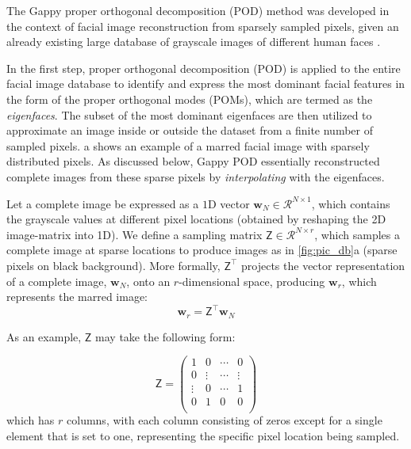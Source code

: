 \documentclass[11pt]{article}
\renewcommand{\vec}[1]{\mathbf{#1}}
\newcommand{\mat}[1]{\mathsf{#1}}
\begin{document}
        The Gappy proper orthogonal decomposition (POD) method was developed in the context of facial image reconstruction from sparsely sampled pixels, given an already existing large database of grayscale images of different human faces \cite{sirovich1987low-dimensional}.


        In the first step, proper orthogonal decomposition (POD) is applied to the entire facial image database to identify and express the most dominant facial features in the form of the proper orthogonal modes (POMs), which are termed as the \textit{eigenfaces}.
        The subset of the most dominant eigenfaces are then utilized to approximate an image inside or outside  the dataset from a finite number of sampled pixels.
        a shows an example of a marred facial image with sparsely distributed pixels.
        As discussed below, Gappy POD essentially reconstructed complete images from these sparse pixels by \textit{interpolating} with the eigenfaces.


        Let a complete image be expressed as a $1$D vector $\vec{w}_N\in \mathcal{R}^{N\times 1}$, which contains the grayscale values at different pixel locations (obtained by reshaping the 2D image-matrix into 1D).
        We define a sampling matrix $\mat{Z}\in \mathcal{R}^{N\times r}$, which samples a complete image at sparse locations to produce images as in \cref{fig:pic_db}a (sparse pixels on black background).
        More formally, $\mat{Z}^{\top}$ projects the vector representation of a complete image, $\vec{w}_N$, onto an $r$-dimensional space, producing $\vec{w}_r$, which represents the marred image:
        \begin{equation}
        {\vec{w}}_r = \mat{Z}^{\top} \vec{w}_N
        \end{equation}

        As an example, $\mat{Z}$ may take the following form:

        \begin{equation}
        \mat{Z} =
        \begin{pmatrix}
            1 & 0 & \cdots & 0\\
            0 &  \vdots & \cdots &  \vdots \\
            \vdots &  0 & \cdots &  1 \\
            0 &  1 & 0 &  0 \\
        \end{pmatrix}
        \end{equation}
        which has $r$ columns, with each column consisting of zeros except for a single element that is set to one, representing the specific pixel location being sampled.
\end{document}
